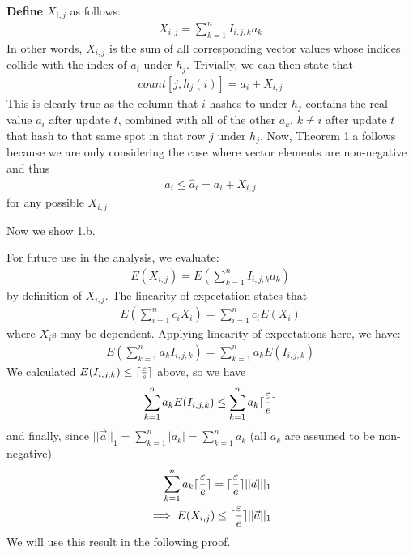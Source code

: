 \documentclass[11pt]{article}
\DeclarePairedDelimiter\ceil{\lceil}{\rceil}
\begin{document}
\textbf{Define} $X_{i, j}$ as follows:
\begin{align}
    X_{i, j} = \sum_{k = 1}^{n}I_{i, j, k} a_k
\end{align}
In other words, $X_{i, j}$ is the sum of all corresponding vector values whose indices
collide with the index of $a_i$ under $h_j$. Trivially, we can then state that
\begin{align}\label{eq:count-def}
    count[j, h_j(i)] = a_i + X_{i, j} 
\end{align}
This is clearly true as the column that $i$ hashes to under $h_j$
contains the real value $a_i$ after update $t$, combined with all of the other
$a_k$, $k \neq i$ after update $t$ that hash to that same spot in that row $j$ under
$h_j$.   Now, Theorem 1.a follows because we are only considering the case where vector
elements are non-negative and thus
\begin{align}
    a_i \leq \hat a_i = a_i + X_{i, j}
\end{align}
for any possible $X_{i, j}$

Now we show 1.b.

For future use in the analysis, we evaluate:
\begin{align}
    E(X_{i, j}) = E\left(\sum_{k = 1}^n I_{i, j, k} a_k\right) 
\end{align}
by definition of $X_{i, j}$. The linearity of expectation states that
\begin{align}
    E(\sum_{i = 1}^{n} c_i X_i) = \sum_{i = 1}^{n} c_i E(X_i)
\end{align}
where $X_i$s may be dependent. Applying linearity of expectations here, we have:
\begin{align}
    E(\sum_{k = 1}^{n} a_k I_{i, j, k}) = \sum_{k = 1}^{n} a_k E(I_{i, j, k}) 
\end{align}
We calculated $E(I_{i, j, k}) \leq \ceil{\frac{\varepsilon}{e}}$ above, so 
we have
\begin{align}
    \sum_{k = 1}^{n} a_k E(I_{i, j, k})  \leq\sum_{k = 1}^{n} a_k \ceil{\frac{\varepsilon}{e}}
\end{align}
and finally, since $||\vec{a}||_1 = \sum_{k = 1}^{n} |a_k| = \sum_{k = 1}^{n} a_k$
(all $a_k$ are assumed to be non-negative)
\begin{align}\label{eqn:expectation-bound}
    \sum_{k = 1}^{n} a_k \ceil{\frac{\varepsilon}{e}} = \ceil{\frac{\varepsilon}{e}} ||\vec{a}|||_1 \nonumber \\
    \implies E(X_{i, j}) \leq \ceil{\frac{\varepsilon}{e}} ||\vec{a}||_1 
\end{align}
We will use this result in the following proof.
\end{document}
